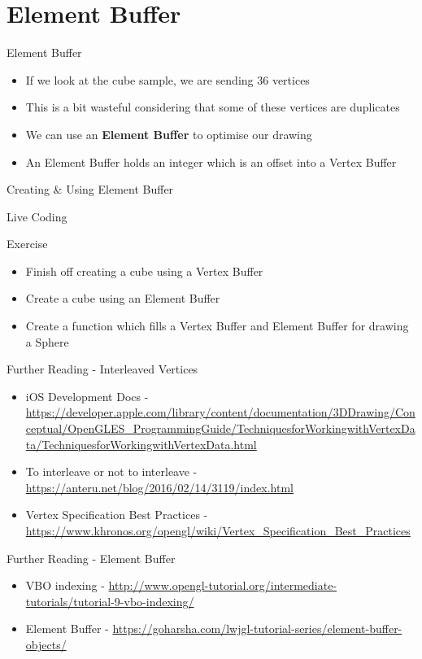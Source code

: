 \part{Element Buffer}
\frame{\partpage}

\begin{frame}{Element Buffer}
	\begin{itemize}
		\pause\item If we look at the cube sample, we are sending 36 vertices
		\pause\item This is a bit wasteful considering that some of these vertices are duplicates
		\pause\item We can use an \textbf{Element Buffer} to optimise our drawing
		\pause\item An Element Buffer holds an integer which is an offset into a Vertex Buffer
	\end{itemize}
\end{frame}

\begin{frame}{Creating \& Using Element Buffer}
	\begin{center}
		Live Coding
	\end{center}
\end{frame}

\begin{frame}{Exercise}
	\begin{itemize}
		\item Finish off creating a cube using a Vertex Buffer
		\item Create a cube using an Element Buffer
		\item Create a function which fills a Vertex Buffer and Element Buffer for drawing a Sphere
	\end{itemize}
\end{frame}

\begin{frame}{Further Reading - Interleaved Vertices}
	\begin{itemize}
		\item iOS Development Docs - \url{https://developer.apple.com/library/content/documentation/3DDrawing/Conceptual/OpenGLES_ProgrammingGuide/TechniquesforWorkingwithVertexData/TechniquesforWorkingwithVertexData.html}
		\item To interleave or not to interleave - \url{https://anteru.net/blog/2016/02/14/3119/index.html}
		\item Vertex Specification Best Practices - \url{https://www.khronos.org/opengl/wiki/Vertex_Specification_Best_Practices}
	\end{itemize}
\end{frame}

\begin{frame}{Further Reading - Element Buffer}
	\begin{itemize}
		\item VBO indexing - \url{http://www.opengl-tutorial.org/intermediate-tutorials/tutorial-9-vbo-indexing/}
		\item Element Buffer - \url{https://goharsha.com/lwjgl-tutorial-series/element-buffer-objects/}
	\end{itemize}
\end{frame}


